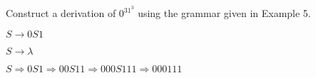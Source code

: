 \documentclass[../main.tex]{subfiles}
\begin{document}
Construct a derivation of $0^31^3$ using the grammar given in Example 5.

$S \rightarrow 0S1$

$S \rightarrow \lambda$

\solution
$S \Rightarrow 0S1 \Rightarrow 00S11 \Rightarrow 000S111 \Rightarrow 000111$
\end{document}

